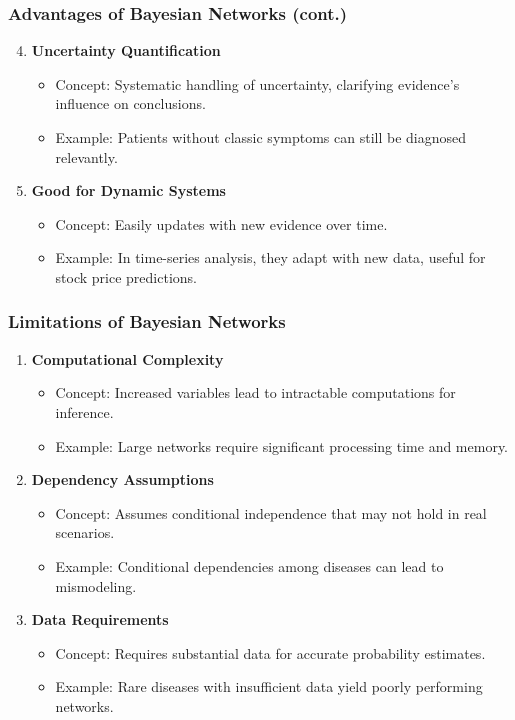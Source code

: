 \documentclass[aspectratio=169]{beamer}
\begin{document}
\begin{frame}[fragile]
    \frametitle{Advantages of Bayesian Networks (cont.)}
    \begin{enumerate}
        \setcounter{enumi}{3} %
        \item \textbf{Uncertainty Quantification}
            \begin{itemize}
                \item Concept: Systematic handling of uncertainty, clarifying evidence's influence on conclusions.
                \item Example: Patients without classic symptoms can still be diagnosed relevantly.
            \end{itemize}
        \item \textbf{Good for Dynamic Systems}
            \begin{itemize}
                \item Concept: Easily updates with new evidence over time.
                \item Example: In time-series analysis, they adapt with new data, useful for stock price predictions.
            \end{itemize}
    \end{enumerate}
\end{frame}

\begin{frame}[fragile]
    \frametitle{Limitations of Bayesian Networks}
    \begin{enumerate}
        \item \textbf{Computational Complexity}
            \begin{itemize}
                \item Concept: Increased variables lead to intractable computations for inference.
                \item Example: Large networks require significant processing time and memory.
            \end{itemize}
        \item \textbf{Dependency Assumptions}
            \begin{itemize}
                \item Concept: Assumes conditional independence that may not hold in real scenarios.
                \item Example: Conditional dependencies among diseases can lead to mismodeling.
            \end{itemize}
        \item \textbf{Data Requirements}
            \begin{itemize}
                \item Concept: Requires substantial data for accurate probability estimates.
                \item Example: Rare diseases with insufficient data yield poorly performing networks.
            \end{itemize}
    \end{enumerate}
\end{frame}
\end{document}
